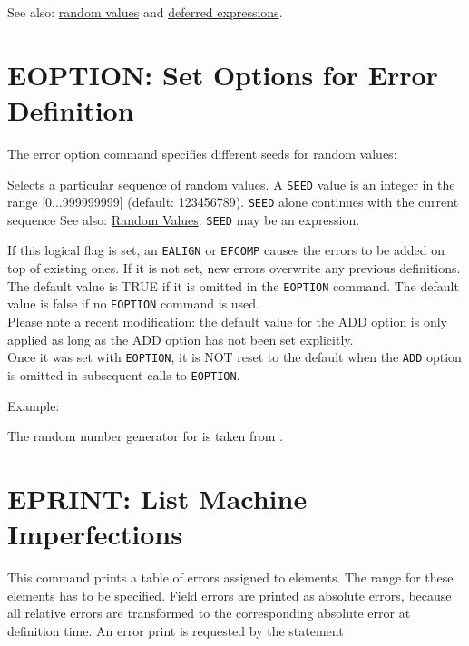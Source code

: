See also: \hyperref[sec:random]{random values}
and \hyperref[sec:defer]{deferred expressions}.  



%

\section{EOPTION: Set Options for Error Definition} %
\label{sec:eoption}
The error option command specifies different seeds for random values:  

\vspace{2mm}
\vspace{5mm}

\begin{madlist}
   Selects a particular sequence of random values. 
  A {\tt SEED} value is an integer in the range [0...999999999] (default:
  123456789). {\tt SEED} alone continues with the current sequence See
  also: \hyperref[sec:random]{Random Values}. {\tt SEED} may be an expression.  

   If this logical flag is set, an {\tt EALIGN} or {\tt EFCOMP} 
  causes the errors to be added on top of existing ones. If it is not set,
  new errors overwrite any previous definitions. The default value is
  TRUE if it is omitted in the {\tt EOPTION} command. The default value is
  false if no {\tt EOPTION} command is used.  
  \\Please note a recent modification: the default value for the ADD
  option is only applied as long as the ADD option has not been set
  explicitly. 
  \\Once it was set with {\tt EOPTION}, it is NOT reset to the default when
  the {\tt ADD} option is omitted in subsequent calls to {\tt EOPTION}.  
\end{madlist}

Example: 

The random number generator for \madx is taken from
\cite{knuth1981}. 


%

\section{EPRINT: List Machine Imperfections}  
\label{sec:eprint}
This command prints a table of errors assigned to elements. The range
for these elements has to be specified. Field errors are printed as
absolute errors, because all relative errors are transformed to the
corresponding absolute error at definition time. An error print is
requested by the statement  


